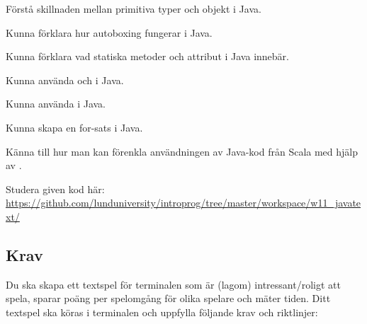 
\Lab{\LabWeekELEVEN}

\begin{Goals}
\item Förstå skillnaden mellan primitiva typer och objekt i Java.
\item Kunna förklara hur autoboxing fungerar i Java.
\item Kunna förklara vad statiska metoder och attribut i Java innebär.
\item Kunna använda  och  i Java.
\item Kunna använda  i Java.
\item Kunna skapa en for-sats i Java.
\item Känna till hur man kan förenkla användningen av Java-kod från Scala med hjälp av .
\end{Goals}

\begin{Preparations}
\item {}
\item Studera given kod här: \url{https://github.com/lunduniversity/introprog/tree/master/workspace/w11_javatext/}
\end{Preparations}

\subsection{Krav}
Du ska skapa ett textspel för terminalen som är (lagom) intressant/roligt att spela, sparar poäng per spelomgång för olika spelare och mäter tiden. Ditt textspel ska köras i terminalen och uppfylla följande krav och riktlinjer:

